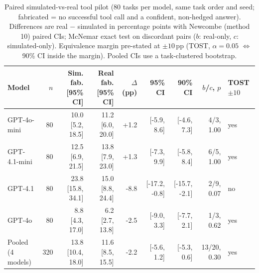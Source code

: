 \begin{table}[t]
\centering\small
\caption{Paired simulated-vs-real tool pilot (80 tasks per model, same task order and seed; fabricated = no successful tool call and a confident, non-hedged answer).
Differences are real $-$ simulated in percentage points with Newcombe (method 10) paired CIs; McNemar exact test on discordant pairs ($b$: real-only, $c$: simulated-only).
Equivalence margin pre-stated at $\pm10$\,pp (TOST, $\alpha=0.05$ $\Leftrightarrow$ 90\% CI inside the margin). Pooled CIs use a task-clustered bootstrap.}
\label{tab:pilot}
\begin{tabular}{lrrrrrrrl}
\toprule
Model & $n$ & Sim. fab. [95\% CI] & Real fab. [95\% CI] & $\Delta$ (pp) & 95\% CI & 90\% CI & $b$/$c$, $p$ & TOST $\pm10$ \\
\midrule
GPT-4o-mini & 80 & 10.0 [5.2, 18.5] & 11.2 [6.0, 20.0] & +1.2 & [-5.9, 8.6] & [-4.6, 7.3] & 4/3, 1.00 & yes \\
GPT-4.1-mini & 80 & 12.5 [6.9, 21.5] & 13.8 [7.9, 23.0] & +1.3 & [-7.3, 9.9] & [-5.8, 8.4] & 6/5, 1.00 & yes \\
GPT-4.1 & 80 & 23.8 [15.8, 34.1] & 15.0 [8.8, 24.4] & -8.8 & [-17.2, -0.8] & [-15.7, -2.1] & 2/9, 0.07 & no \\
GPT-4o & 80 & 8.8 [4.3, 17.0] & 6.2 [2.7, 13.8] & -2.5 & [-9.0, 3.3] & [-7.7, 2.1] & 1/3, 0.62 & yes \\
\midrule
Pooled (4 models) & 320 & 13.8 [10.4, 18.0] & 11.6 [8.5, 15.5] & -2.2 & [-5.6, 1.2] & [-5.3, 0.6] & 13/20, 0.30 & yes \\
\bottomrule
\end{tabular}
\end{table}
